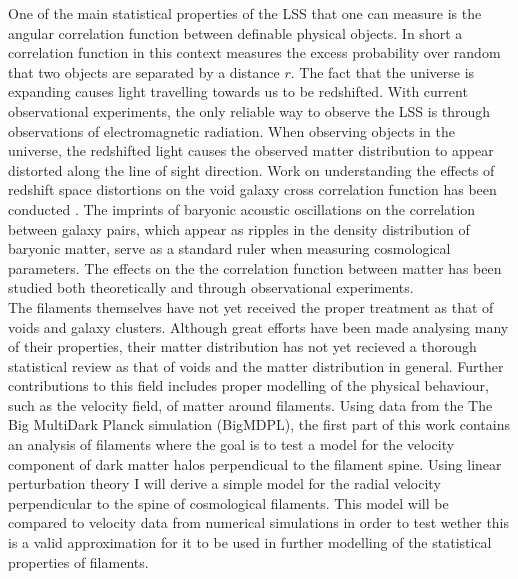 One of the main statistical properties of the LSS that one can measure is the angular correlation function between definable physical objects. In short a correlation function in this context measures the excess probability over random that two objects are separated by a distance $r$. The fact that the universe is expanding\cite{Hubble168} causes light travelling towards us to be redshifted. With current observational experiments, the only reliable way to observe the LSS is through observations of electromagnetic radiation. When observing objects in the universe, the redshifted light causes the observed matter distribution to appear distorted along the line of sight direction. Work on understanding the effects of redshift space distortions on the void galaxy cross correlation function has been conducted \cite{Nadathur_corr}. The imprints of baryonic acoustic oscillations on the correlation between galaxy pairs\cite{pe00300h}, which appear as ripples in the density distribution of baryonic matter, serve as a standard ruler when measuring cosmological parameters. The effects on the the correlation function between matter has been studied both theoretically\cite{peebles1980} and through observational experiments\cite{Eisenstein_2005}. \\\indent
The filaments themselves have not yet received the proper treatment as that of voids and galaxy clusters. Although great efforts have been made analysing many of their properties\cite{Libeskind_2017}, their matter distribution has not yet recieved a thorough statistical review as that of voids and the matter distribution in general. Further contributions to this field includes proper modelling of the physical behaviour, such as the velocity field, of matter around filaments. Using data from the The Big MultiDark Planck simulation (BigMDPL)\cite{Multidark_dataset}, the first part of this work contains an analysis of filaments where the goal is to test a model for the velocity component of dark matter halos perpendicual to the filament spine. Using linear perturbation theory I will derive a simple model for the radial velocity perpendicular to the spine of cosmological filaments. This model will be compared to velocity data from numerical simulations in order to test wether this is a valid approximation for it to be used in further modelling of the statistical properties of filaments.\\\indent
